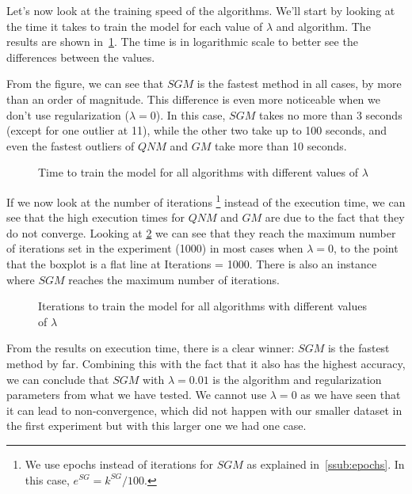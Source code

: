 Let's now look at the training speed of the algorithms. We'll start by looking
at the time it takes to train the model for each value of $\lambda$ and
algorithm. The results are shown in~\cref{fig:lambda_time_2}. The time
is in logarithmic scale to better see the differences between the values.

From the figure, we can see that $SGM$ is the fastest method in all cases, by more
than an order of magnitude. This difference is even more noticeable when
we don't use regularization ($\lambda = 0$). In this case, $SGM$ takes
no more than 3 seconds (except for one outlier at 11), while the other
two take up to 100 seconds, and even the fastest outliers of
$QNM$ and $GM$ take more than 10 seconds.

\begin{figure}[H]
    
    \caption{Time to train the model for all algorithms with different values of $\lambda$}
    \label{fig:lambda_time_2}
\end{figure}

If we now look at the number of iterations%
\footnote{We use epochs instead of iterations for $SGM$ as explained in~\cref{ssub:epochs}.
In this case, ${e^{SG} = k^{SG}/100}$.}
instead of the execution time, we can see that the high execution times for
$QNM$ and $GM$ are due to the fact that they do not converge. Looking at
\cref{fig:lambda_nie_2} we can see that they reach
the maximum number of iterations set in the experiment (1000) in most cases
when $\lambda = 0$, to the point that the boxplot is a flat line at Iterations = 1000.
There is also an instance where $SGM$ reaches the maximum number of iterations.

\begin{figure}[H]
    
    \caption{Iterations to train the model for all algorithms with different values of $\lambda$}
    \label{fig:lambda_nie_2}
\end{figure}

From the results on execution time, there is a clear winner: $SGM$ is the fastest
method by far. Combining this with the fact that it also has the highest accuracy,
we can conclude that $SGM$ with $\lambda = 0.01$ is the algorithm and regularization
parameters from what we have tested. We cannot use $\lambda = 0$ as we have seen that
it can lead to non-convergence, which did not happen with our smaller dataset in the
first experiment but with this larger one we had one case.

\pagebreak
